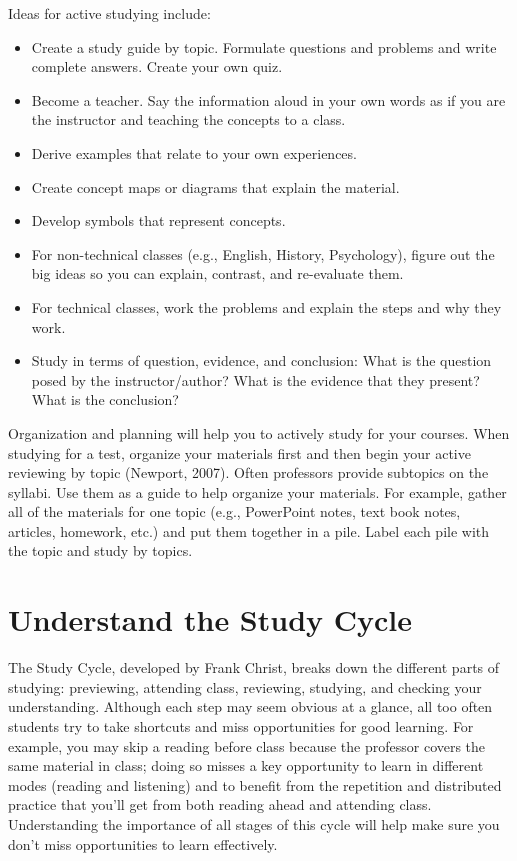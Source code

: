 \documentclass[../main.tex]{subfiles}
\begin{document}
Ideas for active studying include:
%
\begin{itemize}
  \item Create a study guide by topic. Formulate questions and problems and
    write complete answers. Create your own quiz.
  \item Become a teacher. Say the information aloud in your own words as if you
    are the instructor and teaching the concepts to a class.
  \item Derive examples that relate to your own experiences.
  \item Create concept maps or diagrams that explain the material.
  \item Develop symbols that represent concepts.
  \item For non-technical classes (e.g., English, History, Psychology), figure
    out the big ideas so you can explain, contrast, and re-evaluate them.
  \item For technical classes, work the problems and explain the steps and why
    they work.
  \item Study in terms of question, evidence, and conclusion: What is the
    question posed by the instructor/author? What is the evidence that they
    present? What is the conclusion?
\end{itemize}
%
Organization and planning will help you to actively study for your courses. When
studying for a test, organize your materials first and then begin your active
reviewing by topic (Newport, 2007). Often professors provide subtopics on the
syllabi. Use them as a guide to help organize your materials. For example,
gather all of the materials for one topic (e.g., PowerPoint notes, text book
notes, articles, homework, etc.) and put them together in a pile. Label each
pile with the topic and study by topics.
%
\section{Understand the Study Cycle}
The Study Cycle, developed by Frank Christ, breaks down the different parts of
studying: previewing, attending class, reviewing, studying, and checking your
understanding. Although each step may seem obvious at a glance, all too often
students try to take shortcuts and miss opportunities for good learning. For
example, you may skip a reading before class because the professor covers the
same material in class; doing so misses a key opportunity to learn in different
modes (reading and listening) and to benefit from the repetition and distributed
practice that you'll get from both reading ahead and attending class.
Understanding the importance of all stages of this cycle will help make sure you
don't miss opportunities to learn effectively.
%
\end{document}

